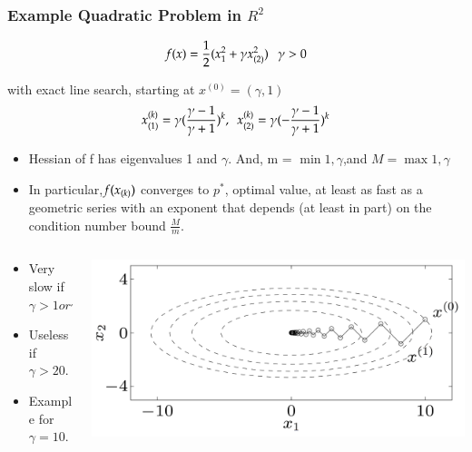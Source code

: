 \begin{frame}
  \frametitle{Example Quadratic Problem in $R^2$}

{
\tiny

$$f(x) = \frac{1}{2}(x_1^2 + \gamma x_{(2)}^2) ~~~ \gamma > 0$$

with exact line search, starting at $x^{(0)} = (\gamma, 1)$
$$x_{(1)}^{(k)} = \gamma (\frac{\gamma - 1}{\gamma + 1})^k, ~~
x_{(2)}^{(k)} = \gamma (-\frac{\gamma - 1}{\gamma + 1})^k$$
}
\vspace{-8mm}

{
\tiny
\begin{itemize}
\item Hessian of f has eigenvalues 1 and $\gamma$. And, m = $\min{1,
    \gamma}$,and $M = \max{1, \gamma}$
\item In particular,$f(x_{(k)})$ converges to $p^*$, optimal value, at
  least as fast as a geometric series with an exponent that depends
  (at least in part) on the condition number bound $\frac{M}{m}$.

\end{itemize}


}
\begin{columns}

  \begin{column}{0.6\textwidth}


\begin{itemize}
\item Very slow if $\gamma > 1 or \gamma < 1$
\item Useless if $\gamma > 20$.
\item Example for $\gamma = 10$.
\end{itemize}
\end{column}

\begin{column}{0.5\textwidth}
\includegraphics[scale=0.12, center]{pics/example.png}
\end{column}


\end{columns}
\end{frame}


